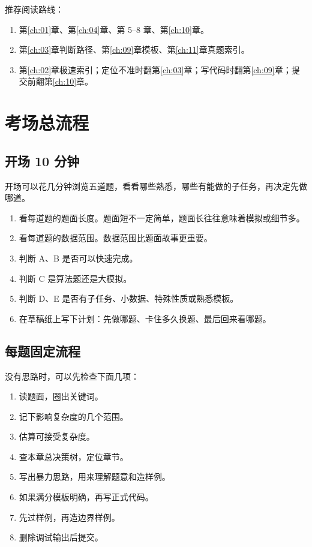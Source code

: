 推荐阅读路线：

\begin{enumerate}
  \item {}第\ref{ch:01}章、第\ref{ch:04}章、第 5--8 章、第\ref{ch:10}章。
  \item {}第\ref{ch:03}章判断路径、第\ref{ch:09}章模板、第\ref{ch:11}章真题索引。
  \item {}第\ref{ch:02}章极速索引；定位不准时翻第\ref{ch:03}章；写代码时翻第\ref{ch:09}章；提交前翻第\ref{ch:10}章。
\end{enumerate}

\section{考场总流程}\label{sec:01-4}

\subsection{开场 10 分钟}

开场可以花几分钟浏览五道题，看看哪些熟悉，哪些有能做的子任务，再决定先做哪道。

\begin{enumerate}
  \item 看每道题的题面长度。题面短不一定简单，题面长往往意味着模拟或细节多。
  \item 看每道题的数据范围。数据范围比题面故事更重要。
  \item 判断 A、B 是否可以快速完成。
  \item 判断 C 是算法题还是大模拟。
  \item 判断 D、E 是否有子任务、小数据、特殊性质或熟悉模板。
  \item 在草稿纸上写下计划：先做哪题、卡住多久换题、最后回来看哪题。
\end{enumerate}

\subsection{每题固定流程}

没有思路时，可以先检查下面几项：

\begin{enumerate}
  \item 读题面，圈出关键词。
  \item 记下影响复杂度的几个范围。
  \item 估算可接受复杂度。
  \item 查本章总决策树，定位章节。
  \item 写出暴力思路，用来理解题意和造样例。
  \item 如果满分模板明确，再写正式代码。
  \item 先过样例，再造边界样例。
  \item 删除调试输出后提交。
\end{enumerate}

